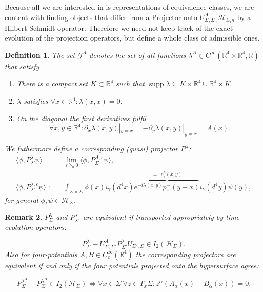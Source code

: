\documentclass[b5paper,draft,openbib,12pt]{memoir}
\newtheorem{Def}{Definition}
\newtheorem{Remark}[Def]{Remark}
\DeclareMathOperator*{\supp}{supp}
\begin{document}
Because all we are interested in is representations of equivalence classes, we are content with finding
objects that differ from a Projector onto \(U_{\Sigma,\Sigma_{\text{in}}}^A \mathcal{H}_{\Sigma_in}^-\) by a Hilbert-Schmidt operator.
Therefore we need not keep track of the exact evolution of the projection operators, but define a whole class of admissible ones.

\begin{Def}\label{def:lambda}
The set \(\mathcal{G}^A\) denotes the set of all functions \(\lambda^A \in C^\infty (\mathbb{R}^4\times \mathbb{R}^4, \mathbb{R})\) that satisfy
\begin{enumerate}[label= \roman*) ]
\item There is a compact set \(K\subset \mathbb{R}^4\) such that \(\supp \lambda \subseteq K\times \mathbb{R}^4 \cup \mathbb{R}^4 \times K\).
\item \(\lambda\) satisfies \(\forall x \in \mathbb{R}^4: \lambda(x,x)=0\).
\item On the diagonal the first derivatives fulfil 
\begin{equation}
\forall x,y\in\mathbb{R}^4: \partial_x \lambda(x,y)|_{y=x}=-\partial_y \lambda(x,y)|_{y=x} = A(x).
\end{equation}
\end{enumerate}
We futhermore define a corresponding (quasi) projector \(P^\lambda\):
\begin{align}
\langle \phi, P^\lambda_\Sigma \psi\rangle =& \lim_{\varepsilon \searrow 0} \langle \phi, P^{A,\varepsilon}_\Sigma \psi\rangle ,\\\label{def:p lambda}
\langle \phi, P^{\lambda,\varepsilon}_\Sigma \psi\rangle :=&
\int_{\Sigma\times\Sigma}\overline{\phi}(x)i_\gamma(d^4x) 
\overbrace{e^{-i \lambda(x,y)} p^-_\varepsilon(y-x)}^{=:p^\lambda_\varepsilon(x,y)}i_\gamma(d^4y) \psi(y),
\end{align}
for general \(\phi, \psi \in \mathcal{H}_\Sigma\).
\end{Def}

\begin{Remark}\label{main results of ivp2}
\(P_{\Sigma}^\lambda\) and \( P_{\Sigma'}^\lambda\) are equivalent if transported appropriately by time evolution operators\cite[theorem 2.8]{ivp2}:

\begin{equation}
P_{\Sigma}^\lambda-U_{\Sigma,\Sigma'}^A P_{\Sigma'}^\lambda U_{\Sigma',\Sigma}\in I_2(\mathcal{H}_\Sigma).
\end{equation}
Also for four-potentials \(A,B\in C_c^\infty(\mathbb{R}^4)\) 
the corresponding projectors are equivalent if and only if the four potentials projected onto the hypersurface agree\cite[theorem 1.5]{ivp2}:

\begin{equation}\label{equiv:pLambda}
P_{\Sigma}^{\lambda^A} - P_{\Sigma}^{\lambda^B} \in I_2(\mathcal{H}_\Sigma) \iff \forall x\in \Sigma~ \forall z\in T_x \Sigma: z^\alpha(A_\alpha(x)-B_\alpha(x))=0.
\end{equation}
\end{Remark}
\end{document}
